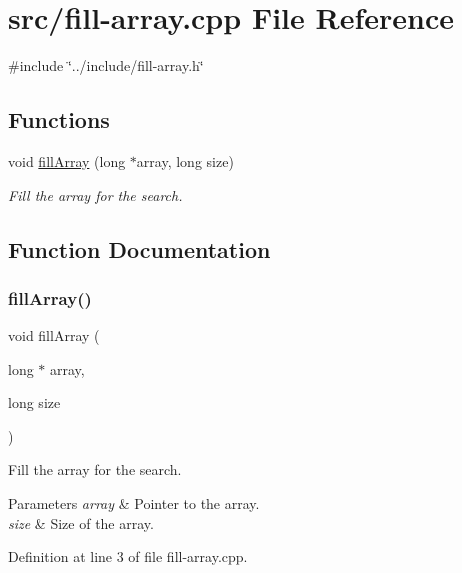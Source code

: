 \hypertarget{fill-array_8cpp}{}\section{src/fill-\/array.cpp File Reference}
\label{fill-array_8cpp}
{\ttfamily \#include \char`\"{}../include/fill-\/array.\+h\char`\"{}}\newline
\subsection*{Functions}
\begin{DoxyCompactItemize}
\item 
void \mbox{\hyperlink{fill-array_8cpp_aa598c97a8086476a5d6143bc845e5027}{fill\+Array}} (long $\ast$array, long size)
\begin{DoxyCompactList}\small\item\em Fill the array for the search. \end{DoxyCompactList}\end{DoxyCompactItemize}


\subsection{Function Documentation}
\mbox{\label{fill-array_8cpp_aa598c97a8086476a5d6143bc845e5027}} 
\subsubsection{\texorpdfstring{fillArray()}{fillArray()}}
{\footnotesize\ttfamily void fill\+Array (\begin{DoxyParamCaption}\item[{long $\ast$}]{array,  }\item[{long}]{size }\end{DoxyParamCaption})}



Fill the array for the search. 


\begin{DoxyParams}{Parameters}
{\em array} & Pointer to the array. \\
\hline
{\em size} & Size of the array. \\
\hline
\end{DoxyParams}


Definition at line 3 of file fill-\/array.\+cpp.

